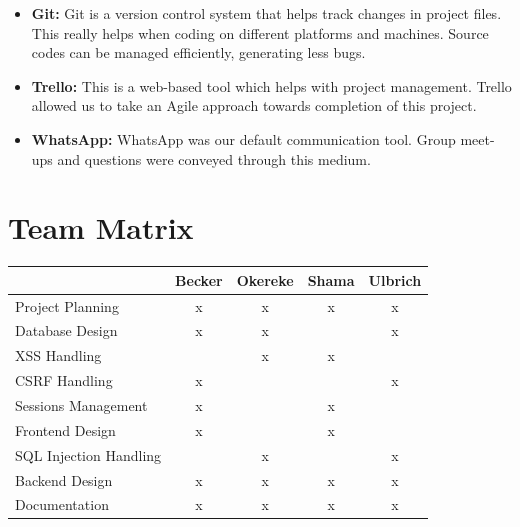 \documentclass[12pt,a4paper]{article}
\begin{document}
	\begin{itemize}
		\item \textbf{Git:} Git is a version control system that helps track changes in project files. This really helps when coding on different platforms and machines. Source codes can be managed efficiently, generating less bugs.
		
		\item \textbf{Trello:} This is a web-based tool which helps with project management. Trello allowed us to take an Agile approach towards completion of this project.
		
		\item \textbf{WhatsApp:} WhatsApp was our default communication tool. Group meet-ups and questions were conveyed through this medium.
			
	\end{itemize}
	
	
	\section {Team Matrix}
	
	\begin{tabular}{|l|c|c|c|c|}
		
		\hline
		 & Becker & Okereke & Shama & Ulbrich \\ \hline
		 Project Planning & x & x & x & x \\ \hline
		 Database Design & x & x &  & x \\ \hline
		 XSS Handling &  & x & x &   \\ \hline
		 CSRF Handling & x &  &  & x  \\ \hline
		 Sessions Management & x &  & x &  \\ \hline
		 Frontend Design & x &  & x &  \\ \hline
		 SQL Injection Handling &  & x &  & x \\ \hline
		 Backend Design & x & x & x & x \\ \hline
		 Documentation & x & x & x & x \\ \hline
		 
	\end{tabular}
	
	
	
	
	
\end{document}
